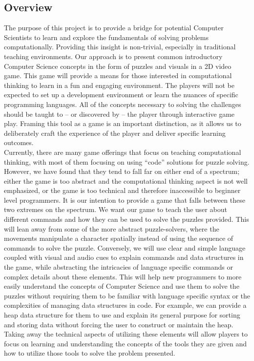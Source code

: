 \subsection{Overview}
The purpose of this project is to provide a bridge for potential Computer
Scientists to learn and explore the fundamentals of solving problems
computationally. Providing this insight is non-trivial, especially in
traditional teaching environments. Our approach is to present common
introductory Computer Science concepts in the form of puzzles and visuals in a
2D video game. This game will provide a means for those interested in
computational thinking to learn in a fun and engaging environment. The players
will not be expected to set up a development environment or learn the nuances of
specific programming languages. All of the concepts necessary to solving the
challenges should be taught to -- or discovered by -- the player through interactive
game play. Framing this tool as a game is an important distinction, as it allows
us to deliberately craft the experience of the player and deliver specific learning
outcomes.\\

Currently, there are many game offerings that focus on teaching computational
thinking, with most of them focusing on using “code” solutions for puzzle
solving. However, we have found that they tend to fall far on either end of a
spectrum; either the game is too abstract and the computational thinking aspect
is not well emphasized, or the game is too technical and therefore inaccessible
to beginner level programmers. It is our intention to provide a game that falls
between these two extremes on the spectrum. We want our game to teach the user
about different commands and how they can be used to solve the puzzles
provided. This will lean away from some of the more abstract puzzle-solvers,
where the movements manipulate a character spatially instead of using the
sequence of commands to solve the puzzle. Conversely, we will use clear and
simple language coupled with visual and audio cues to explain commands and data
structures in the game, while abstracting the intricacies of language specific
commands or complex details about these elements. This will help new programmers
to more easily understand the concepts of Computer Science and use them to solve
the puzzles without requiring them to be familiar with language specific syntax
or the complexities of managing data structures in code. For example, we can
provide a heap data structure for them to use and explain its general purpose
for sorting and storing data without forcing the user to construct or maintain
the heap. Taking away the technical aspects of utilizing these elements will
allow players to focus on learning and understanding the concepts of the tools
they are given and how to utilize those tools to solve the problem presented.\\

